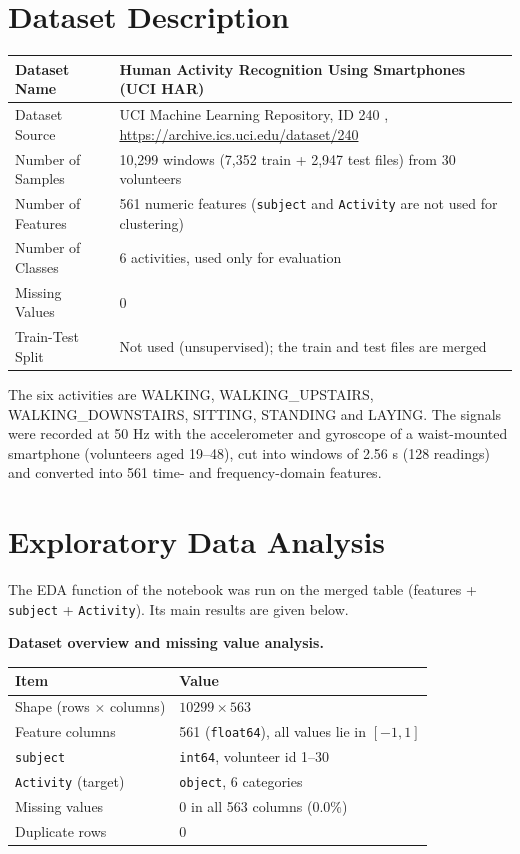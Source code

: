 \documentclass[12pt,a4paper]{article}
\begin{document}
\section{Dataset Description}
\begin{longtable}{|p{4.6cm}|p{10cm}|}
\hline
Dataset Name & Human Activity Recognition Using Smartphones (UCI HAR) \\ \hline
Dataset Source & UCI Machine Learning Repository, ID 240 \cite{anguita2013,uci_har}, \url{https://archive.ics.uci.edu/dataset/240} \\ \hline
Number of Samples & 10,299 windows (7,352 train + 2,947 test files) from 30 volunteers \\ \hline
Number of Features & 561 numeric features (\texttt{subject} and \texttt{Activity} are not used for clustering) \\ \hline
Number of Classes & 6 activities, used only for evaluation \\ \hline
Missing Values & 0 \\ \hline
Train-Test Split & Not used (unsupervised); the train and test files are merged \\ \hline
\end{longtable}

The six activities are WALKING, WALKING\_UPSTAIRS, WALKING\_DOWNSTAIRS, SITTING, STANDING and LAYING. The signals were recorded at 50 Hz with the accelerometer and gyroscope of a waist-mounted smartphone (volunteers aged 19--48), cut into windows of 2.56 s (128 readings) and converted into 561 time- and frequency-domain features.

\section{Exploratory Data Analysis}\label{sec:eda}
The EDA function of the notebook was run on the merged table (features + \texttt{subject} + \texttt{Activity}). Its main results are given below.

\textbf{Dataset overview and missing value analysis.}

\begin{center}
\small
\begin{tabular}{ll}
\toprule
Item & Value \\
\midrule
Shape (rows $\times$ columns) & $10299 \times 563$ \\
Feature columns & 561 (\texttt{float64}), all values lie in $[-1,1]$ \\
\texttt{subject} & \texttt{int64}, volunteer id 1--30 \\
\texttt{Activity} (target) & \texttt{object}, 6 categories \\
Missing values & 0 in all 563 columns (0.0\%) \\
Duplicate rows & 0 \\
\bottomrule
\end{tabular}
\end{center}
\end{document}
